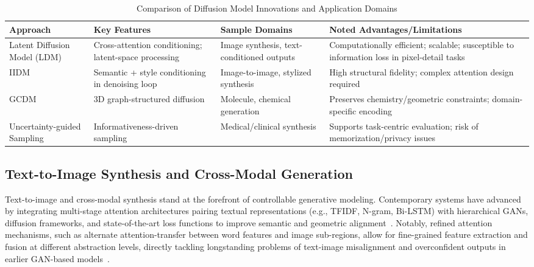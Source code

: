 \documentclass[sigconf]{acmart}
\begin{document}
\begin{table*}[htbp]
\centering
\caption{Comparison of Diffusion Model Innovations and Application Domains}
\label{tab:diffusion_summary}
\begin{adjustbox}{max width=\textwidth}
\begin{tabular}{llll}
\toprule
\textbf{Approach} & \textbf{Key Features} & \textbf{Sample Domains} & \textbf{Noted Advantages/Limitations} \\
\midrule
Latent Diffusion Model (LDM) & Cross-attention conditioning; latent-space processing & Image synthesis, text-conditioned outputs & Computationally efficient; scalable; susceptible to information loss in pixel-detail tasks \\
IIDM & Semantic + style conditioning in denoising loop & Image-to-image, stylized synthesis & High structural fidelity; complex attention design required \\
GCDM & 3D graph-structured diffusion & Molecule, chemical generation & Preserves chemistry/geometric constraints; domain-specific encoding \\
Uncertainty-guided Sampling & Informativeness-driven sampling & Medical/clinical synthesis & Supports task-centric evaluation; risk of memorization/privacy issues \\
\bottomrule
\end{tabular}
\end{adjustbox}
\end{table*}

\subsection{Text-to-Image Synthesis and Cross-Modal Generation}

Text-to-image and cross-modal synthesis stand at the forefront of controllable generative modeling. Contemporary systems have advanced by integrating multi-stage attention architectures pairing textual representations (e.g., TFIDF, N-gram, Bi-LSTM) with hierarchical GANs, diffusion frameworks, and state-of-the-art loss functions to improve semantic and geometric alignment~\cite{ref94,ref96}. Notably, refined attention mechanisms, such as alternate attention-transfer between word features and image sub-regions, allow for fine-grained feature extraction and fusion at different abstraction levels, directly tackling longstanding problems of text-image misalignment and overconfident outputs in earlier GAN-based models~\cite{ref94,ref96}.
\end{document}
